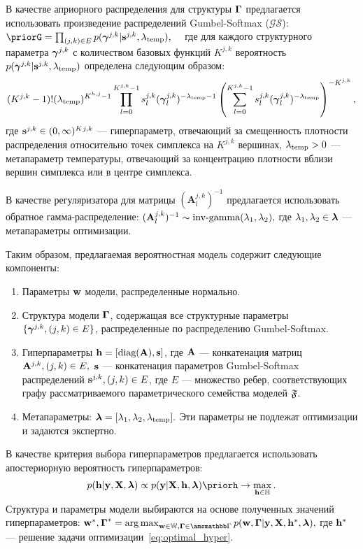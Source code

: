 \documentclass[11pt, a5paper]{dissert}
\theoremstyle{definition}
\DeclareMathOperator*{\argmax}{arg\,max}
\begin{document}
{В качестве априорного распределения для структуры $\boldsymbol{\Gamma}$ предлагается использовать произведение распределений Gumbel-Softmax ($\mathcal{GS}$):
$
    \priorG = \prod_{(j,k) \in E} p(\g^{j,k}|\s^{j,k}, \lamT), \quad 
$
где для каждого структурного параметра $\boldsymbol{\gamma}^{j,k}$ с количеством базовых функций $K^{j,k}$ вероятность $p(\boldsymbol{\gamma}^{j,k}|\mathbf{s}^{j,k}, \lambda_{\text{temp}})$ определена следующим образом:
\begin{multline}
\label{eq:gs_pdf}
    (K^{j,k}-1)!(\lambda_{\text{temp}})^{K^{h,j}-1}\prod_{l=0}^{K^{j,k}-1} s^{j,k}_l(\boldsymbol{\gamma}^{j,k}_l)^{-\lambda_{\text{temp}} -1}  \left(\sum_{l=0}^{K^{j,k}-1} s^{j,k}_l(\boldsymbol{\gamma}^{j,k}_l)^{-\lambda_{\text{temp}}}\right)^{-K^{j,k}},
\end{multline}
где $\mathbf{s}^{j,k} \in (0,\infty)^K{^{j,k}}$ --- гиперпараметр, отвечающий за смещенность плотности распределения относительно точек симплекса на $K^{j,k}$ вершинах, $\lambda_{\text{temp}} > 0$ --- метапараметр температуры, отвечающий за концентрацию плотности вблизи вершин симплекса или в центре симплекса.


В качестве регуляризатора для матрицы $(\mathbf{A}^{j,k}_l)^{-1}$ предлагается использовать обратное гамма-распределение:
$
    (\mathbf{A}^{j,k}_l)^{-1} \sim \text{inv-gamma}(\lambda_1,\lambda_2),
$
где $\lambda_1,\lambda_2 \in \boldsymbol{\lambda}$ --- метапараметры оптимизации. 

Таким образом, предлагаемая вероятностная модель содержит следующие компоненты:
\begin{enumerate}
\item Параметры $\mathbf{w}$ модели, распределенные нормально.
\item Структура модели $\boldsymbol{\Gamma}$, содержащая все структурные параметры $\{\boldsymbol{\gamma}^{j,k}, (j,k) \in E\}$, распределенные по распределению Gumbel-Softmax.
\item Гиперпараметры $\mathbf{h} = [\text{diag}(\mathbf{A}), \mathbf{s}]$, где $\mathbf{A}$ --- конкатенация матриц $\mathbf{A}^{j,k}, (j,k) \in E,$ $\mathbf{s}$ --- конкатенация параметров Gumbel-Softmax распределений $\mathbf{s}^{j,k}, (j,k) \in E$, где $E$ --- множество ребер, соответствующих графу рассматриваемого параметрического семейства моделей $\mathfrak{F}$.
\item Метапараметры: $\boldsymbol{\lambda} = [\lambda_1, \lambda_2, \lambda_{\text{temp}}].$ Эти параметры не подлежат оптимизации и задаются экспертно. 
\end{enumerate}

В качестве критерия выбора гиперпараметров предлагается использовать апостериорную вероятность гиперпараметров:
\begin{equation}
\label{eq:optimal_hyper}
    \posth \propto \EV \priorh \to \max_{\h \in \Hb}.
\end{equation}
Структура и параметры модели выбираются на основе полученных значений гиперпараметров:
$
    \w^*,\G^* = \argmax_{\w \in \Wb, \G \in \Gb} p(\w, \G|\y, \X, \h^*, \lam ),
$
где $\mathbf{h}^*$ --- решение задачи оптимизации~\eqref{eq:optimal_hyper}.

}
\end{document}

